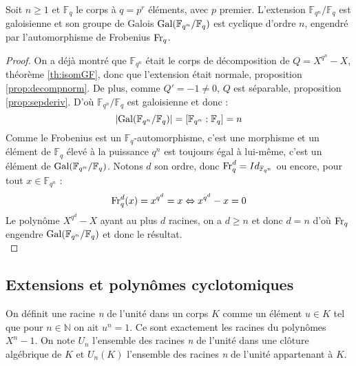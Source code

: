 \documentclass[a4paper]{article} %
\numberwithin{section}{part}
\numberwithin{equation}{section}
\newcommand\nroot[1]{\textit{#1}\up{\textit{ième}}}
\newcommand\GF[1]{\mathbb{F}_{#1}}
\newcommand\NN{\mathbb{N}}
\begin{document}
\begin{thm}
Soit $n\geq1$ et $\GF{q}$ le corps à $q=p^r$ éléments, avec $p$ premier.
L'extension $\GF{q^n}/\GF{q}$ est galoisienne et son groupe de Galois
$\textup{Gal}(\GF{q^n}/\GF{q})$ est cyclique d'ordre $n$, engendré par 
l'automorphisme de Frobenius $\textup{Fr}_q$.
\end{thm}
\begin{proof}
On a déjà montré que $\GF{q^n}$ était le corps de décomposition de $Q = X^{q^n} 
- X$, théorème \ref{th:isomGF}, donc que l'extension était normale, proposition 
\ref{prop:decompnorm}. De plus, comme $Q' = -1 \neq 0$, $Q$ est séparable,
proposition \ref{prop:sepderiv}.  D'où $\GF{q^n}/\GF{q}$ est galoisienne et donc
:
\[|\textup{Gal}(\GF{q^n}/\GF{q})| = [\GF{q^n}:\GF{q}] = n\]
Comme le Frobenius est un $\GF{q}$-automorphisme, c'est une morphisme et un 
élément de $\GF{q}$ élevé à la puissance $q^n$ est toujours égal à lui-même, 
c'est un élément de $\textup{Gal}(\GF{q^n}/\GF{q})$. Notons $d$ son ordre, donc
$\textup{Fr}_q^d = Id_{\GF{q^n}}$ ou encore, pour tout $x\in\GF{q^n}$ :
\[\textup{Fr}_q^d(x) = x^{q^d} = x \Leftrightarrow x^{q^d} - x = 0\]
Le polynôme $X^{q^d} - X$ ayant au plus $d$ racines, on a $d\geq n$ et donc $d =
n$ d'où $\textup{Fr}_q$ engendre $\textup{Gal}(\GF{q^n}/\GF{q})$ et donc le
résultat.\\
\end{proof}


\subsection{Extensions et polynômes cyclotomiques}
On définit une racine \nroot{n} de l'unité dans un corps $K$ 
comme un élément $u\in K$ tel que pour $n\in\NN$ on ait $u^n = 1$. Ce 
sont exactement les racines du polynômes $X^n - 1$.
On note $U_n$ l'ensemble des racines \nroot{n} de l'unité dans une clôture 
algébrique de $K$ et $U_n(K)$ l'ensemble des racines \nroot{n} de l'unité 
appartenant à $K$.
\end{document}
